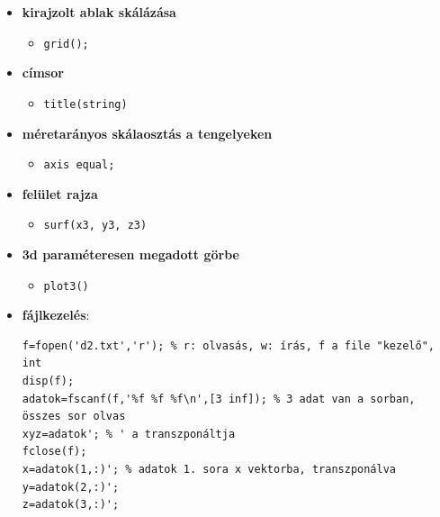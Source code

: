 \begin{itemize}
\begin{itemize}
    \end{itemize}
    \item \textbf{kirajzolt ablak skálázása}
    \begin{itemize}
        \item \verb|grid();|
    \end{itemize}
    \item \textbf{címsor}
    \begin{itemize}
        \item \verb|title(string)|
    \end{itemize}
    \item \textbf{méretarányos skálaosztás a tengelyeken}
    \begin{itemize}
        \item \verb|axis equal;|
    \end{itemize}
    \item \textbf{felület rajza}
    \begin{itemize}
        \item \verb|surf(x3, y3, z3)|
    \end{itemize}
    \item \textbf{3d paraméteresen megadott görbe}
    \begin{itemize}
        \item \verb|plot3()|
    \end{itemize}
    \item \textbf{fájlkezelés}:
\begin{verbatim}
f=fopen('d2.txt','r'); % r: olvasás, w: írás, f a file "kezelő", int
disp(f);
adatok=fscanf(f,'%f %f %f\n',[3 inf]); % 3 adat van a sorban, összes sor olvas
xyz=adatok'; % ' a transzponáltja
fclose(f);
x=adatok(1,:)'; % adatok 1. sora x vektorba, transzponálva
y=adatok(2,:)';
z=adatok(3,:)';
\end{verbatim}
\end{itemize}